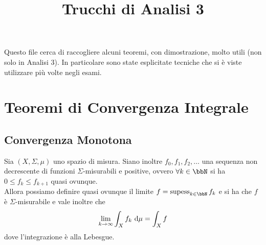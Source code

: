 \documentclass[a4paper,NoNotes,GeneralMath]{stdmdoc}
\DeclareMathOperator{\supess}{supess}
\begin{document}
	\title{Trucchi di Analisi 3}
	Questo file cerca di raccogliere alcuni teoremi, con dimostrazione, molto utili (non solo in Analisi 3). In particolare sono state esplicitate tecniche che si è viste utilizzare più volte negli esami.
	
	\section*{Teoremi di Convergenza Integrale}
	\subsection*{Convergenza Monotona}
	Sia $(X, \Sigma, \mu)$ uno spazio di misura. Siano inoltre $f_0, f_1, f_2, \ldots$ una sequenza non decrescente di funzioni $\Sigma$-misurabili e positive, ovvero $\forall k \in \bbN$ si ha $0 \le f_k \le f_{k + 1}$ quasi ovunque. \\
	Allora possiamo definire quasi ovunque il limite $f = \supess_{k \in \bbN} f_k$ e si ha che $f$ è $\Sigma$-misurabile e vale inoltre che
	$$ \lim_{k \rar \infty} \int_X f_k \de \mu = \int_X f $$
	dove l'integrazione è alla Lebesgue.
	
\end{document}
